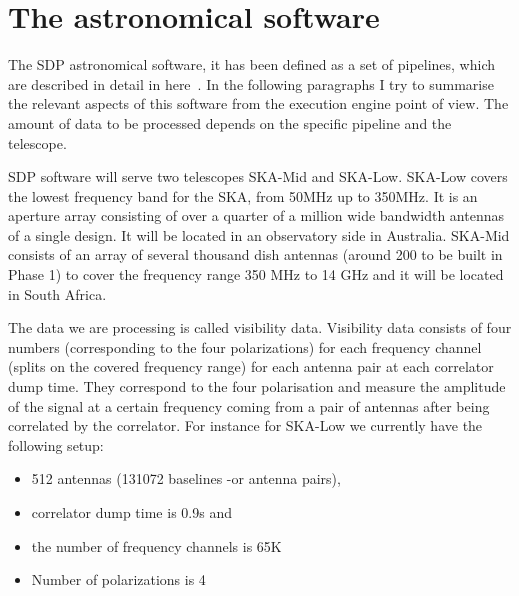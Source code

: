 

\section{The astronomical software}
The SDP astronomical software, it has been defined as a set of pipelines, which are described in detail in here~\cite{SDPpipelines}.
In the following paragraphs I try to summarise the relevant aspects of this software from the execution engine point of view.
The amount of data to be processed depends on the specific pipeline and the telescope. 

SDP software will serve two telescopes SKA-Mid and SKA-Low. SKA-Low covers the lowest frequency band for the SKA, from 50MHz up to 350MHz. 
It is an aperture array consisting of over a quarter of a million wide bandwidth antennas of a single design. It will be located in an observatory side 
in Australia. SKA-Mid consists of an array of several thousand dish antennas 
(around 200 to be built in Phase 1) to cover the frequency range 350 MHz to 14 GHz and it will be located in South Africa.

The data we are processing is called visibility data. Visibility data consists of four numbers (corresponding to the four polarizations) 
 for each frequency channel (splits on the covered frequency range)
 for each antenna pair at each correlator dump time. 
They correspond to the four polarisation and measure the amplitude of the signal at a certain frequency coming from a pair of antennas after
being correlated by the correlator. For instance for SKA-Low we currently have the following setup:
\begin{itemize}
\item 512 antennas (131072 baselines -or antenna pairs), 
\item correlator dump time is 0.9s and 
\item the number of frequency channels is 65K
\item Number of polarizations is 4
\end{itemize}

